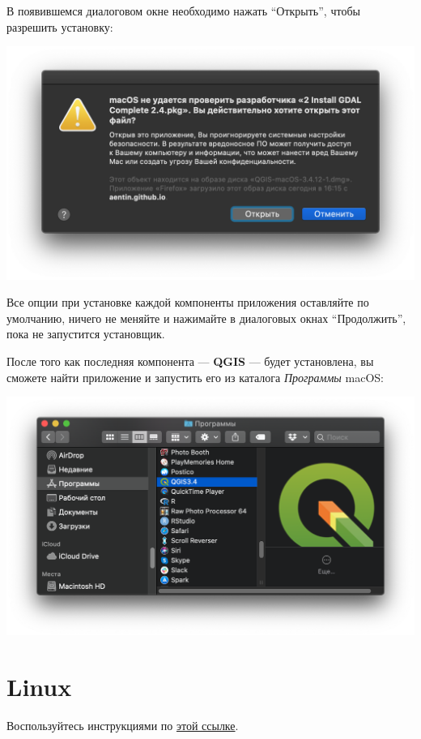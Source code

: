 \documentclass[
  12pt,
]{book}
\begin{document}
В появившемся диалоговом окне необходимо нажать ``Открыть'', чтобы разрешить установку:

\includegraphics{images/installation_instruction_mac/mac04.png}

Все опции при установке каждой компоненты приложения оставляйте по умолчанию, ничего не меняйте и нажимайте в диалоговых окнах ``Продолжить'', пока не запустится установщик.

После того как последняя компонента --- \textbf{QGIS} --- будет установлена, вы сможете найти приложение и запустить его из каталога \emph{Программы} macOS:

\includegraphics{images/installation_instruction_mac/mac05.png}

\hypertarget{linux}{%
\section*{Linux}\label{linux}}

Воспользуйтесь инструкциями по \href{https://qgis.org/ru/site/forusers/alldownloads.html\#linux}{этой ссылке}.
\end{document}
